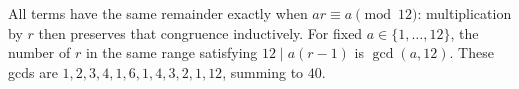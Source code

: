 All terms have the same remainder exactly when $ar\equiv a\pmod{12}$: multiplication by $r$ then preserves that congruence inductively. For fixed $a\in\{1,\ldots,12\}$, the number of $r$ in the same range satisfying $12\mid a(r-1)$ is $\gcd(a,12)$. These gcds are $1,2,3,4,1,6,1,4,3,2,1,12$, summing to $\boxed{40}$.
